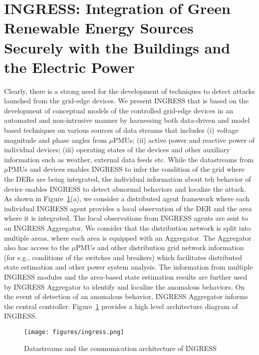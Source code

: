 \documentclass[conference]{IEEEtran}
\begin{document}
\section{INGRESS: Integration of Green Renewable Energy Sources Securely with the Buildings and the Electric Power}
\label{sec:ingress}
Clearly, there is a strong need for the development of techniques to detect attacks launched from the grid-edge devices. We present INGRESS that is based on the development of conceptual models of the controlled grid-edge devices in an automated and non-intrusive manner by harnessing both data-driven and model based techniques on various sources of data streams that includes (i) voltage magnitude and phase angles from $\mu$PMUs; (ii)  active power and reactive power of individual devices; (iii) operating states of the devices and other auxiliary information such as weather, external data feeds etc. While the datastreams from $\mu$PMUs and devices enables INGRESS to infer the condition of the grid where the DERs are being integrated, the individual information about teh behavior of device enables INGRESS to detect abnormal behaviors and localize the attack. As shown in Figure~\ref{overview}(a), we consider a distributed agent framework where each individual INGRESS agent provides a local observation of the DER and the area where it is integrated. The local observations from INGRESS agents are sent to an INGRESS Aggregator. We consider that the distribution network is split into multiple areas, where each area is equipped with an Aggregator. The Aggregator also has access to the $\mu$PMUs and other distribution grid network information (for e.g., conditions of the switches and breakers) which facilitates distributed state estimation and other power system analysis. The information from multiple INGRESS modules and the area-based state estimation results are further used by INGRESS Aggregator to identify and localize the anomalous behaviors. On the event of detection of an anomalous behavior, INGRESS Aggregator informs the central controller. 
Figure~\ref{overview} provides a high level architecture diagram of INGRESS.
\begin{figure}[t!]
	\centering
	\texttt{[image: figures/ingress.png]}
	\caption{Datastreams and the communication architecture of INGRESS}
	\label{overview}
\end{figure}
\end{document}
